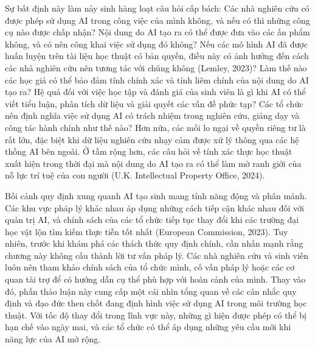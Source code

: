 Sự bất định này làm nảy sinh hàng loạt câu hỏi cấp bách: Các nhà nghiên cứu có được phép sử dụng AI trong công việc của mình không, và nếu có thì những công cụ nào được chấp nhận? Nội dung do AI tạo ra có thể được đưa vào các ấn phẩm không, và có nên công khai việc sử dụng đó không? Nếu các mô hình AI đã được huấn luyện trên tài liệu học thuật có bản quyền, điều này có ảnh hưởng đến cách các nhà nghiên cứu nên tương tác với chúng không (Lemley, 2023)? Làm thế nào các học giả có thể bảo đảm tính chính xác và tính liêm chính của nội dung do AI tạo ra? Hệ quả đối với việc học tập và đánh giá của sinh viên là gì khi AI có thể viết tiểu luận, phân tích dữ liệu và giải quyết các vấn đề phức tạp? Các tổ chức nên định nghĩa việc sử dụng AI có trách nhiệm trong nghiên cứu, giảng dạy và công tác hành chính như thế nào? Hơn nữa, các mối lo ngại về quyền riêng tư là rất lớn, đặc biệt khi dữ liệu nghiên cứu nhạy cảm được xử lý thông qua các hệ thống AI bên ngoài. Ở tầm rộng hơn, các câu hỏi về tính xác thực học thuật xuất hiện trong thời đại mà nội dung do AI tạo ra có thể làm mờ ranh giới của nỗ lực trí tuệ của con người (U.K. Intellectual Property Office, 2024).

Bối cảnh quy định xung quanh AI tạo sinh mang tính năng động và phân mảnh. Các khu vực pháp lý khác nhau áp dụng những cách tiếp cận khác nhau đối với quản trị AI, và chính sách của các tổ chức tiếp tục thay đổi khi các trường đại học vật lộn tìm kiếm thực tiễn tốt nhất (European Commission, 2023). Tuy nhiên, trước khi khám phá các thách thức quy định chính, cần nhấn mạnh rằng chương này không cấu thành lời tư vấn pháp lý. Các nhà nghiên cứu và sinh viên luôn nên tham khảo chính sách của tổ chức mình, cố vấn pháp lý hoặc các cơ quan tài trợ để có hướng dẫn cụ thể phù hợp với hoàn cảnh của mình. Thay vào đó, phần thảo luận này cung cấp một cái nhìn tổng quan về các cân nhắc quy định và đạo đức then chốt đang định hình việc sử dụng AI trong môi trường học thuật. Với tốc độ thay đổi trong lĩnh vực này, những gì hiện được phép có thể bị hạn chế vào ngày mai, và các tổ chức có thể áp dụng những yêu cầu mới khi năng lực của AI mở rộng.

